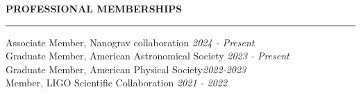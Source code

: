\documentclass{resume} %
\renewenvironment{rSection}[1]{
\sectionskip
\textbf{\textcolor{C2}{\MakeUppercase{#1}}}
\sectionlineskip
\hrule
\begin{list}{}{
\setlength{\leftmargin}{1.5em}
}
\item[]
}{
\end{list}
}
\begin{document}
\begin{rSection}{Professional Memberships}
{Associate Member,  {\color{C3} Nanograv collaboration}} \hfill {\em 2024 - \rm Present}\\
{Graduate Member,  {\color{C3} American Astronomical Society}} \hfill {\em 2023 - \rm Present}\\
{Graduate Member, {\color{C3} American Physical Society}}\hfill {\em 2022-2023} \\
{Member, {\color{C3} LIGO Scientific Collaboration}} \hfill {\em 2021 - 2022}
\end{rSection}









\end{document}
